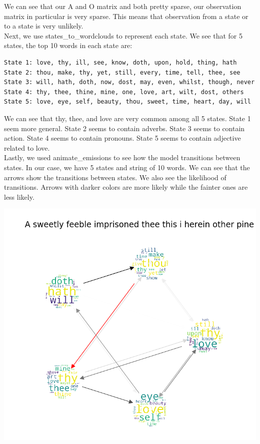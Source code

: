 We can see that our A and O matrix and both pretty sparse, our observation matrix in particular is very sparse. This means that observation from a state or to a state is very unlikely. \\
Next, we use states_to_wordclouds to represent each state. We see that for 5 states, the top 10 words in each state are: \\
\begin{verbatim}
State 1: love, thy, ill, see, know, doth, upon, hold, thing, hath
State 2: thou, make, thy, yet, still, every, time, tell, thee, see
State 3: will, hath, doth, now, dost, may, even, whilst, though, never
State 4: thy, thee, thine, mine, one, love, art, wilt, dost, others
State 5: love, eye, self, beauty, thou, sweet, time, heart, day, will
\end{verbatim}
We can see that thy, thee, and love are very common among all 5 states. State 1 seem more general. State 2 seems to contain adverbs. State 3 seems to contain action. State 4 seems to contain pronouns. State 5 seems to contain adjective related to love. \\
Lastly, we used animate_emissions to see how the model transitions between states. In our case, we have 5 states and string of 10 words. We can see that the arrows show the transitions between states. We also see the likelihood of transitions. Arrows with darker colors are more likely while the fainter ones are less likely. 
\begin{center}
	\includegraphics[width=14cm]{Picture/Vis}
\end{center}
